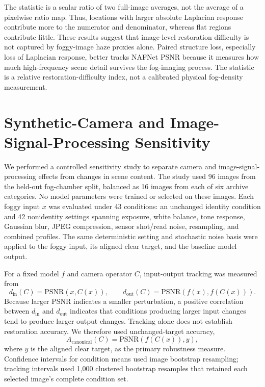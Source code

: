 \documentclass[9pt]{osa-supplemental-document}
\begin{document}
The statistic is a scalar ratio of two full-image averages, not the average of a pixelwise ratio map. Thus, locations with larger absolute Laplacian response contribute more to the numerator and denominator, whereas flat regions contribute little. These results suggest that image-level restoration difficulty is not captured by foggy-image haze proxies alone. Paired structure loss, especially loss of Laplacian response, better tracks NAFNet PSNR because it measures how much high-frequency scene detail survives the fog-imaging process. The statistic is a relative restoration-difficulty index, not a calibrated physical fog-density measurement.

\section{Synthetic-Camera and Image-Signal-Processing Sensitivity}
\label{secS:synthetic_camera}

We performed a controlled sensitivity study to separate camera and
image-signal-processing effects from changes in scene content. The study
used 96 images from the held-out fog-chamber split, balanced as 16 images
from each of six archive categories. No model parameters were trained or
selected on these images. Each foggy input $x$ was evaluated under 43
conditions: an unchanged identity condition and 42 nonidentity settings
spanning exposure, white balance, tone response, Gaussian blur, JPEG
compression, sensor shot/read noise, resampling, and combined profiles.
The same deterministic setting and stochastic noise basis were applied to
the foggy input, its aligned clear target, and the baseline model output.

For a fixed model $f$ and camera operator $C$, input-output tracking was
measured from
\begin{equation}
d_{\mathrm{in}}(C)=\mathrm{PSNR}(x,C(x)), \qquad
d_{\mathrm{out}}(C)=\mathrm{PSNR}(f(x),f(C(x))).
\label{eqS:camera_tracking}
\end{equation}
Because larger PSNR indicates a smaller perturbation, a positive
correlation between $d_{\mathrm{in}}$ and $d_{\mathrm{out}}$ indicates
that conditions producing larger input changes tend to produce larger
output changes. Tracking alone does not establish restoration accuracy.
We therefore used unchanged-target accuracy,
\begin{equation}
A_{\mathrm{canonical}}(C)=\mathrm{PSNR}(f(C(x)),y),
\label{eqS:camera_accuracy}
\end{equation}
where $y$ is the aligned clear target, as the primary robustness measure.
Confidence intervals for condition means used image bootstrap resampling;
tracking intervals used 1{,}000 clustered bootstrap resamples that retained
each selected image's complete condition set.
\end{document}
